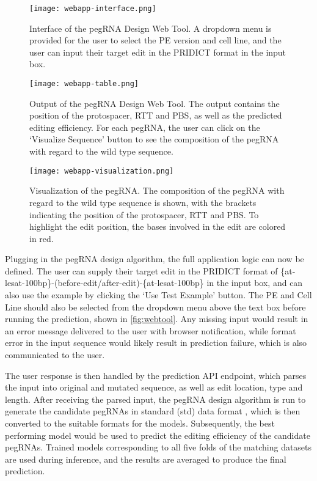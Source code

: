 \begin{figure}
    \centering
    \texttt{[image: webapp-interface.png]}
    \caption[pegRNA Design Web Tool Interface]{Interface of the pegRNA Design Web Tool. A dropdown menu is provided for the user to select the PE version and cell line, and the user can input their target edit in the PRIDICT format in the input box.}
    \label{fig:webtool}
\end{figure}



\begin{figure}
    \centering
    \texttt{[image: webapp-table.png]}
    \caption[pegRNA Design Web Tool Output]{Output of the pegRNA Design Web Tool. The output contains the position of the protospacer, RTT and PBS, as well as the predicted editing efficiency. For each pegRNA, the user can click on the `Visualize Sequence' button to see the composition of the pegRNA with regard to the wild type sequence.}
    \label{fig:webtool-output}
\end{figure}

\begin{figure}
    \centering
    \texttt{[image: webapp-visualization.png]}
    \caption[pegRNA Design Web Tool Visualization]{Visualization of the pegRNA. The composition of the pegRNA with regard to the wild type sequence is shown, with the brackets indicating the position of the protospacer, RTT and PBS. To highlight the edit position, the bases involved in the edit are colored in red.}
    \label{fig:webtool-visualize}
\end{figure}


Plugging in the pegRNA design algorithm, the full application logic can now be defined.
The user can supply their target edit in the PRIDICT format of \{at-lesat-100bp\}-(before-edit/after-edit)-\{at-lesat-100bp\} in the input box, and can also use the example by clicking the `Use Test Example' button. The PE and Cell Line should also be selected from the dropdown menu above the text box before running the prediction, shown in \autoref{fig:webtool}. Any missing input would result in an error message delivered to the user with browser notification, while format error in the input sequence would likely result in prediction failure, which is also communicated to the user.

The user response is then handled by the prediction API endpoint, which parses the input into original and mutated sequence, as well as edit location, type and length. After receiving the parsed input, the pegRNA design algorithm is run to generate the candidate pegRNAs in standard (std) data format
, which is then converted to the suitable formats for the models. Subsequently, the best performing model would be used to predict the editing efficiency of the candidate pegRNAs. Trained models corresponding to all five folds of the matching datasets are used during inference, and the results are averaged to produce the final prediction. 

